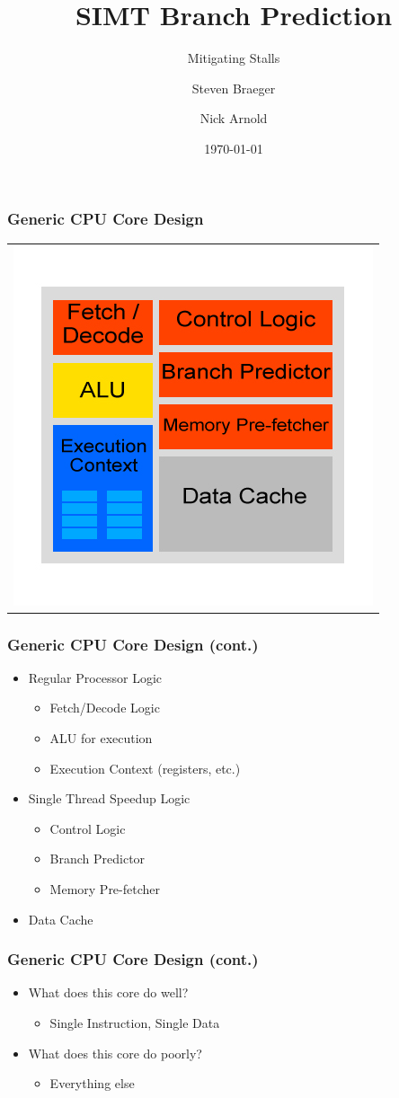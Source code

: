 \documentclass{beamer}
\title
{SIMT Branch Prediction}
\subtitle{Mitigating Stalls}
\author
{Steven Braeger \and Nick Arnold}
\institute
{
  \inst{1}%
  University of Central Florida
}
\date
{\today}
\begin{document}
\frame{\titlepage}

\begin{frame}
	\frametitle{Generic CPU Core Design}
	\begin{tabular}{c}
		\includegraphics[width=.75\textwidth]{CPU-design.jpg}
	\end{tabular}
\end{frame}

\begin{frame}
	\frametitle{Generic CPU Core Design (cont.)}
	\begin{itemize}
		\item Regular Processor Logic
		\begin{itemize}
			\item Fetch/Decode Logic
			\item ALU for execution
			\item Execution Context (registers, etc.)
		\end{itemize}
		\item Single Thread Speedup Logic
		\begin{itemize}
			\item Control Logic
			\item Branch Predictor
			\item Memory Pre-fetcher
		\end{itemize}
		\item Data Cache
	\end{itemize}
\end{frame}

\begin{frame}
	\frametitle{Generic CPU Core Design (cont.)}
	\begin{itemize}
		\item What does this core do well?
		\begin{itemize}
			\item Single Instruction, Single Data
		\end{itemize}
		\item What does this core do poorly?
		\begin{itemize}
			\item Everything else
		\end{itemize}
	\end{itemize}
\end{frame}
\end{document}
